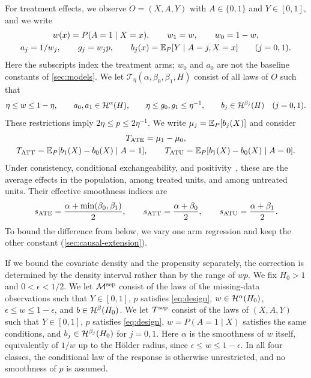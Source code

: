 For treatment effects, we observe $O=(X,A,Y)$ with $A\in\{0,1\}$ and
$Y\in[0,1]$, and we write
\[
 \begin{gathered}
 w(x)=P(A=1\mid X=x),\qquad w_1=w,\qquad w_0=1-w,\\
 a_j=1/w_j,\qquad g_j=w_jp,\qquad b_j(x)=\mathbb E_P[Y\mid A=j,X=x]
 \qquad(j=0,1).
 \end{gathered}
\]
Here the subscripts index the treatment arms; $w_0$ and $a_0$ are not
the baseline constants of \cref{sec:models}. We let
$\mathcal T_\eta(\alpha,\beta_0,\beta_1,H)$ consist of all laws of $O$
such that
\begin{equation}\label{eq:two-arm-class}
 \eta\le w\le1-\eta,\qquad
 a_0,a_1\in\mathcal H^\alpha(H),\qquad
 \eta\le g_0,g_1\le\eta^{-1},\qquad
 b_j\in\mathcal H^{\beta_j}(H)\quad(j=0,1).
\end{equation}
These restrictions imply $2\eta\le p\le2\eta^{-1}$. We write
$\mu_j=\mathbb E_P[b_j(X)]$ and consider
\begin{equation}\label{eq:treatment-functionals}
 \begin{gathered}
 T_{\rm ATE}=\mu_1-\mu_0,\\
 T_{\rm ATT}=\mathbb E_P[b_1(X)-b_0(X)\mid A=1],\qquad
 T_{\rm ATU}=\mathbb E_P[b_1(X)-b_0(X)\mid A=0].
 \end{gathered}
\end{equation}
Under consistency, conditional exchangeability, and
positivity~\cite{hernanrobins}, these are the average effects in the
population, among treated units, and among untreated units. Their effective smoothness indices are
\begin{equation}\label{eq:treatment-smoothness}
 s_{\rm ATE}=\frac{\alpha+\min(\beta_0,\beta_1)}2,\qquad
 s_{\rm ATT}=\frac{\alpha+\beta_0}2,\qquad
 s_{\rm ATU}=\frac{\alpha+\beta_1}2.
\end{equation}
To bound the difference from below, we vary one arm regression and keep
the other constant (\cref{sec:causal-extension}).

If we bound the covariate density and the propensity separately, the
correction is determined by the density interval rather than by the
range of $wp$. We fix $H_0>1$ and $0<\epsilon<1/2$. We let
$\mathcal M^{\rm sep}$ consist of the laws of the missing-data
observations such that $Y\in[0,1]$, $p$ satisfies \eqref{eq:design},
$w\in\mathcal H^\alpha(H_0)$, $\epsilon\le w\le1-\epsilon$, and
$b\in\mathcal H^\beta(H_0)$. We let $\mathcal T^{\rm sep}$ consist of the laws
of $(X,A,Y)$ such that $Y\in[0,1]$, $p$ satisfies \eqref{eq:design},
$w=P(A=1\mid X)$ satisfies the same conditions, and
$b_j\in\mathcal H^{\beta_j}(H_0)$ for $j=0,1$. Here $\alpha$ is the smoothness
of $w$ itself, equivalently of $1/w$ up to the H\"older radius, since
$\epsilon\le w\le1-\epsilon$. In all four
classes, the conditional law of the response is otherwise
unrestricted, and no smoothness of $p$ is assumed.

